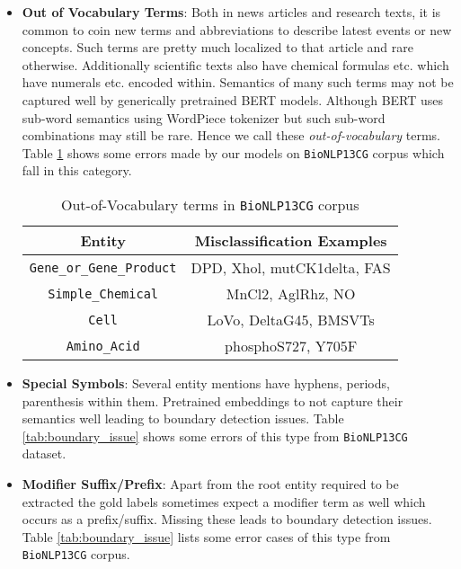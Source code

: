\begin{itemize}
    \item \textbf{Out of Vocabulary Terms}: Both in news articles and research texts, it is common to coin new terms and abbreviations to describe latest events or new concepts. Such terms are pretty much localized to that article and rare otherwise. Additionally scientific texts also have chemical formulas etc. which have numerals etc. encoded within. Semantics of many such terms may not be captured well by generically pretrained BERT models. Although BERT uses sub-word semantics using WordPiece tokenizer but such sub-word combinations may still be rare. Hence we call these \textit{out-of-vocabulary} terms. Table \ref{tab:oov_issue} shows some errors made by our models on \texttt{BioNLP13CG} corpus which fall in this category.
    
    \begin{table}[h!]
    \centering
    \begin{tabular}{|c|c|}\hline
    	\textbf{Entity} & \textbf{Misclassification Examples}\\\hline
    	\texttt{Gene\_or\_Gene\_Product} & DPD, Xhol, mutCK1delta, FAS\\\hline
    	\texttt{Simple\_Chemical} & MnCl2, AglRhz, NO\\\hline
    	\texttt{Cell} & LoVo, DeltaG45, BMSVTs\\\hline
    	\texttt{Amino\_Acid} & phosphoS727, Y705F\\\hline
    	\end{tabular}
        \caption{Out-of-Vocabulary terms in \texttt{BioNLP13CG} corpus}
        \label{tab:oov_issue}
    \end{table}
    
    \item \textbf{Special Symbols}: Several entity mentions have hyphens, periods, parenthesis within them. Pretrained embeddings to not capture their semantics well leading to boundary detection issues. Table \ref{tab:boundary_issue} shows some errors of this type from \texttt{BioNLP13CG} dataset.
    
    \item \textbf{Modifier Suffix/Prefix}: Apart from the root entity required to be extracted the gold labels sometimes expect a modifier term as well which occurs as a prefix/suffix. Missing these leads to boundary detection issues. Table \ref{tab:boundary_issue} lists some error cases of this type from \texttt{BioNLP13CG} corpus.
    

\end{itemize}
